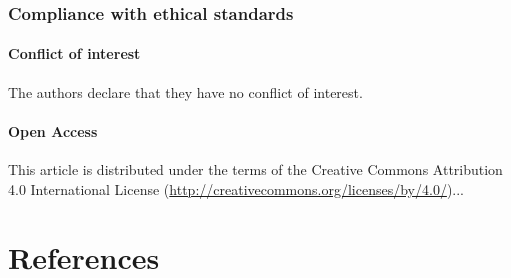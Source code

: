 \documentclass[%
a4paper,12pt,ngerman,UKenglish,twoside]{book}
\begin{document}
\begin{refsection}
\subsubsection*{Compliance with ethical standards}
\paragraph*{Conflict of interest}
The authors declare that they have no conflict of interest.

\paragraph*{Open Access}
 This article is distributed under the terms of the Creative Commons Attribution 4.0 International License (\url{http://creativecommons.org/licenses/by/4.0/})...

\section[References]{References}
\printbibliography[heading=none]
\end{refsection}

\end{document}
